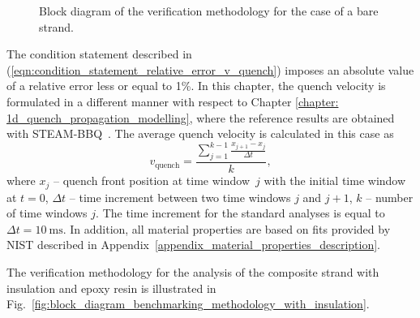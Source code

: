 \begin{figure}[H]
    \caption{Block diagram of the verification methodology for the case of a bare strand.}
    \label{fig:block_diagram_benchmarking_methodology_no_insulation}
\end{figure}

The condition statement described in (\ref{eqn:condition_statement_relative_error_v_quench}) imposes an absolute value of a relative error less or equal to 1\%. In this chapter, the quench velocity is formulated in a different manner with respect to Chapter \ref{chapter: 1d_quench_propagation_modelling}, where the reference results are obtained with STEAM-BBQ~\cite{BBQ_manual}. The average quench velocity is calculated in this case as
\begin{equation}
    v_\text{quench} = \frac{ \sum_{j=1}^{k-1} \frac{x_{j+1}-x_j}{\Delta t} }{k},
    \label{eqn:new_quench_velocity}
\end{equation}
where $x_j$ -- quench front position at time window~$j$ with the initial time window at $t=0$, $\Delta t$ -- time increment between two time windows $j$ and $j+1$, $k$ -- number of time windows $j$. The time increment for the standard analyses is equal to $\Delta t=10~\text{ms}$. In addition, all material properties are based on fits provided by NIST described in Appendix~\ref{appendix_material_properties_description}.

The verification methodology for the analysis of the composite strand with insulation and epoxy resin is illustrated in Fig.~\ref{fig:block_diagram_benchmarking_methodology_with_insulation}.

